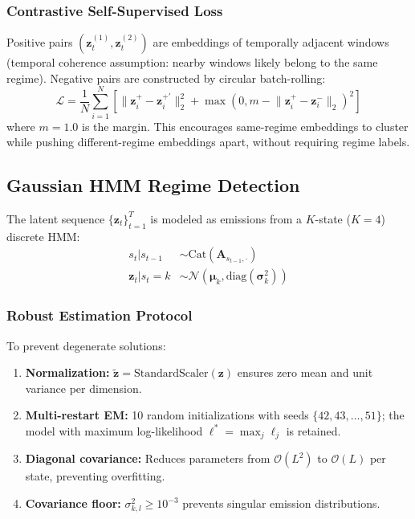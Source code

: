 \documentclass[conference, twocolumn]{IEEEtran}
\begin{document}
\subsubsection{Contrastive Self-Supervised Loss}
Positive pairs $(\mathbf{z}_t^{(1)}, \mathbf{z}_t^{(2)})$ are embeddings of temporally adjacent windows (temporal coherence assumption: nearby windows likely belong to the same regime). Negative pairs are constructed by circular batch-rolling:
\begin{equation}
    \mathcal{L} = \frac{1}{N}\!\sum_{i=1}^{N}\!\left[\|\mathbf{z}_i^+ \!-\! \mathbf{z}_i^{+\prime}\|_2^2 + \max\!\left(0, m \!-\! \|\mathbf{z}_i^+ \!-\! \mathbf{z}_i^{-}\|_2\right)^{\!2}\right]
\label{eq:loss}
\end{equation}
where $m=1.0$ is the margin. This encourages same-regime embeddings to cluster while pushing different-regime embeddings apart, without requiring regime labels.

\subsection{Gaussian HMM Regime Detection}
\label{sec:hmm}

The latent sequence $\{\mathbf{z}_t\}_{t=1}^{T}$ is modeled as emissions from a $K$-state ($K\!=\!4$) discrete HMM:
\begin{align}
    s_t | s_{t-1} &\sim \text{Cat}(\mathbf{A}_{s_{t-1}, \cdot}) \label{eq:hmm_trans}\\
    \mathbf{z}_t | s_t\!=\!k &\sim \mathcal{N}(\boldsymbol{\mu}_k, \text{diag}(\boldsymbol{\sigma}_k^2)) \label{eq:hmm_emit}
\end{align}

\subsubsection{Robust Estimation Protocol}
To prevent degenerate solutions:
\begin{enumerate}
    \item \textbf{Normalization:} $\tilde{\mathbf{z}} = \text{StandardScaler}(\mathbf{z})$ ensures zero mean and unit variance per dimension.
    \item \textbf{Multi-restart EM:} 10 random initializations with seeds $\{42, 43, \ldots, 51\}$; the model with maximum log-likelihood $\ell^* = \max_j \ell_j$ is retained.
    \item \textbf{Diagonal covariance:} Reduces parameters from $\mathcal{O}(L^2)$ to $\mathcal{O}(L)$ per state, preventing overfitting.
    \item \textbf{Covariance floor:} $\sigma_{k,l}^2 \geq 10^{-3}$ prevents singular emission distributions.
\end{enumerate}
\end{document}

